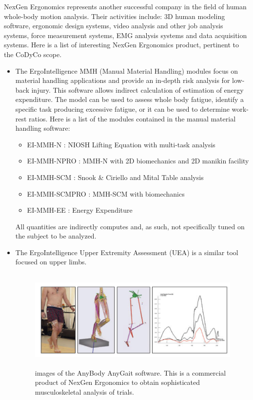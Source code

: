 \documentclass[12pt,a4paper,twoside]{article}
\begin{document}
NexGen Ergonomics represents another successful company in the field of human whole-body motion analysis. Their activities include: 3D human modeling software, ergonomic design systems, video analysis and other job analysis systems, force measurement systems, EMG analysis systems and data acquisition systems. Here is a list of interesting  NexGen Ergonomics product, pertinent to the CoDyCo scope.
\begin{itemize}
\item The ErgoIntelligence MMH (Manual Material Handling) modules focus on material handling applications and provide an in-depth risk analysis for low-back injury.  This software allows indirect calculation of estimation of energy expenditure. The model can be used to assess whole body fatigue, identify a specific task producing excessive fatigue, or it can be used to determine work-rest ratios. Here is a list of the modules contained in the manual material handling software:
\begin{itemize}
\item EI-MMH-N : NIOSH Lifting Equation with multi-task analysis
\item EI-MMH-NPRO : MMH-N with 2D biomechanics and 2D manikin facility
\item EI-MMH-SCM : Snook \& Ciriello and Mital Table analysis
\item EI-MMH-SCMPRO : MMH-SCM with biomechanics
\item EI-MMH-EE : Energy Expenditure
\end{itemize}
All quantities are indirectly computes and, as such, not specifically tuned on the subject to be analyzed. 

\item The ErgoIntelligence Upper Extremity Assessment (UEA) is a similar tool focused on upper limbs. 

\begin{figure} 
\begin{center}
\includegraphics[height=5cm]{images/anyGait.png}
\caption{images of the AnyBody AnyGait software. This is a commercial product of NexGen Ergonomics to obtain sophisticated musculoskeletal analysis of trials. }\label{fig:anyGait}
\end{center}
\end{figure}


\end{itemize}
\end{document}
